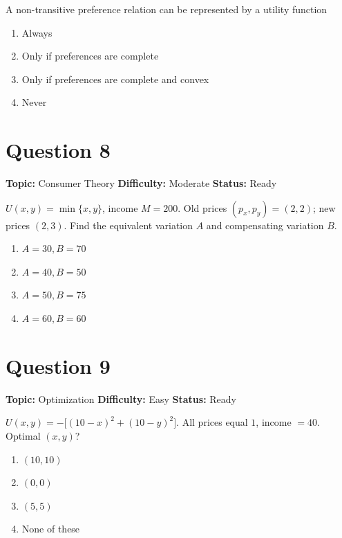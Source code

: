 \documentclass[11pt]{article}
\begin{document}
A non-transitive preference relation can be represented by a utility function
\begin{enumerate}[label=(\Alph*)]
\item Always
\item Only if preferences are complete
\item Only if preferences are complete and convex
\item Never
\end{enumerate}

\newpage

\section*{Question 8}


\noindent\textbf{Topic:} Consumer Theory \quad \textbf{Difficulty:} Moderate \quad \textbf{Status:} Ready



$U(x,y) = \min\{x,y\}$, income $M = 200$. Old prices $(p_x, p_y) = (2,2)$; new prices $(2,3)$.
Find the equivalent variation $A$ and compensating variation $B$.
\begin{enumerate}[label=(\Alph*)]
\item $A = 30, B = 70$
\item $A = 40, B = 50$
\item $A = 50, B = 75$
\item $A = 60, B = 60$
\end{enumerate}

\newpage

\section*{Question 9}


\noindent\textbf{Topic:} Optimization \quad \textbf{Difficulty:} Easy \quad \textbf{Status:} Ready



$U(x,y) = -\big[(10-x)^2 + (10-y)^2\big]$. All prices equal $1$, income $= 40$.
Optimal $(x,y)$?
\begin{enumerate}[label=(\Alph*)]
\item $(10,10)$
\item $(0,0)$
\item $(5,5)$
\item None of these
\end{enumerate}
\end{document}
